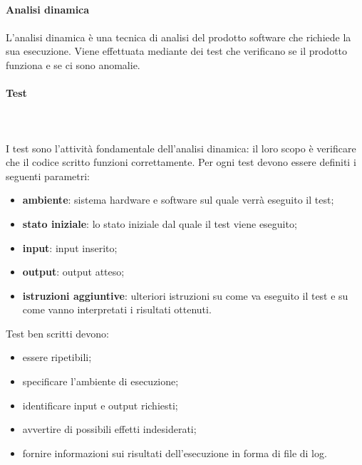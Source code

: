			\mbox{}\\								
			\textbf{Analisi dinamica} \mbox{}\\ \mbox{}\\
			L'analisi dinamica è una tecnica di analisi del prodotto software che richiede la sua esecuzione. Viene effettuata  mediante dei test che verificano se il prodotto funziona e se ci sono anomalie. 
			
		\paragraph{Test} \mbox{}\\ \mbox{}\\
		I test sono l'attività fondamentale dell'analisi dinamica: il loro scopo è verificare che il codice scritto funzioni correttamente.
		Per ogni test devono essere definiti i seguenti parametri:
		\begin{itemize}
			\item \textbf{ambiente}: sistema hardware e software sul quale verrà eseguito il test;
			\item \textbf{stato iniziale}: lo stato iniziale dal quale il test viene eseguito;
			\item \textbf{input}: input inserito;
			\item \textbf{output}: output atteso;
			\item \textbf{istruzioni aggiuntive}: ulteriori istruzioni su come va eseguito il test e su come vanno interpretati i risultati ottenuti.
		\end{itemize}
		Test ben scritti devono:
		\begin{itemize}
			\item essere ripetibili;
			\item specificare l'ambiente di esecuzione;
			\item identificare input e output richiesti;
			\item avvertire di possibili effetti indesiderati;
			\item fornire informazioni sui risultati dell'esecuzione in forma di file di log.
		\end{itemize}	
			
